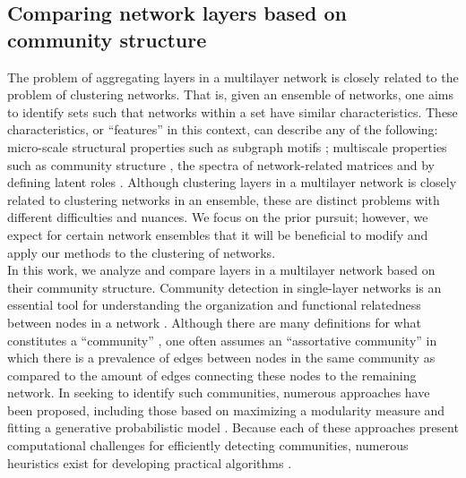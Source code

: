 \subsection{Comparing network layers based on community structure}
\indent The problem of aggregating layers in a multilayer network is closely related to the problem of clustering networks. That is, given an ensemble of networks, one aims to identify sets such that networks within a set have similar characteristics. 
These characteristics, or ``features'' in this context, can describe any of the following: micro-scale structural properties such as subgraph motifs \cite{ugander2013subgraph,motiffinding}; multiscale properties such as community structure \cite{taxonomy,NONCluster,confusingMesoscopic}, the spectra of network-related matrices \cite{structurenetwork} and by defining latent roles \cite{netensemble}. Although clustering layers in a multilayer network is closely related to clustering networks in an ensemble, these are distinct problems with different difficulties and nuances. We focus on the prior pursuit; however, we expect for certain network ensembles that it will be beneficial to modify and apply our methods to the clustering of networks. 
\\
\indent 
In this work, we analyze and compare layers in a multilayer network based on their community structure. Community detection in single-layer networks is an essential tool for understanding the organization and functional relatedness between nodes in a network \cite{porter2009communities,fortunato}.
Although there are many definitions for what constitutes a ``community'' \cite{rombach2014core}, one often assumes an ``assortative community'' in which there is a prevalence of edges between nodes in the same community as compared to the amount of edges connecting these nodes to the remaining network. In seeking to identify such communities, numerous approaches have been proposed, including those based on
maximizing a modularity measure \cite{newmanmodularity} and fitting a generative probabilistic model \cite{abby}. Because each of these approaches present computational challenges for efficiently detecting communities, numerous heuristics exist for developing practical algorithms \cite{community,fortunato,leskoveccommunity,clausethierarchy,newmanspectral}. \\

